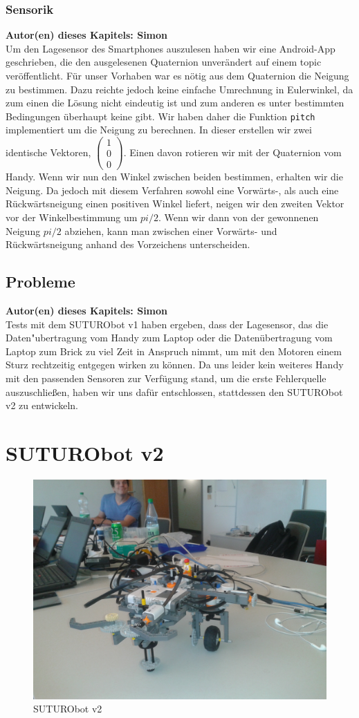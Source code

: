 \documentclass[8pt]{article}
\newcommand{\secauthor}[1]{\textbf{Autor(en) dieses Kapitels: {#1}}\\}
\begin{document}
\subsubsection{Sensorik} 
\secauthor{Simon}
Um den Lagesensor des Smartphones auszulesen haben wir eine Android-App geschrieben, die den ausgelesenen Quaternion unverändert auf einem topic veröffentlicht.
Für unser Vorhaben war es nötig aus dem Quaternion die Neigung zu bestimmen. Dazu reichte jedoch keine einfache Umrechnung in Eulerwinkel, da zum einen die Lösung nicht eindeutig ist und zum anderen es unter bestimmten Bedingungen überhaupt keine gibt. Wir haben daher die Funktion \texttt{pitch} implementiert um die Neigung zu berechnen. In dieser erstellen wir zwei identische Vektoren, $\left( \begin{array}{c} 1 \\ 0 \\ 0
\end{array} \right)$. Einen davon rotieren wir mit der Quaternion vom Handy. Wenn wir nun den Winkel zwischen beiden bestimmen, erhalten wir die Neigung. Da jedoch mit diesem Verfahren sowohl eine Vorwärts-, als auch eine Rückwärtsneigung einen positiven Winkel liefert, neigen wir den zweiten Vektor vor der Winkelbestimmung um $pi / 2$. Wenn wir dann von der gewonnenen Neigung $pi / 2$ abziehen, kann man zwischen einer Vorwärts- und Rückwärtsneigung anhand des Vorzeichens unterscheiden.

\subsection{Probleme} 
\secauthor{Simon}
Tests mit dem SUTURObot v1 haben ergeben, dass der Lagesensor, das die Daten"ubertragung vom Handy zum Laptop oder die Datenübertragung vom Laptop zum Brick zu viel Zeit in Anspruch nimmt, um mit den Motoren einem Sturz rechtzeitig entgegen wirken zu können. Da uns leider kein weiteres Handy mit den passenden Sensoren zur Verfügung stand, um die erste Fehlerquelle auszuschließen, haben wir uns dafür entschlossen, stattdessen den SUTURObot v2 zu entwickeln.

\section{SUTURObot v2}
\begin{figure}[h]
  \begin{center}
    \includegraphics[width=.5\textwidth]{pictures/SUTURObot-v2.jpg}
  \end{center}
  \caption{SUTURObot v2}
  \label{fig:SUTURObot2}
\end{figure}
\end{document}
